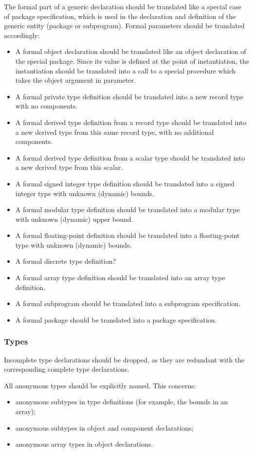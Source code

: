 \documentclass{article}
\newcounter{example}
\begin{document}
The formal part of a generic declaration should be translated like a special
case of package specification, which is used in the declaration and definition
of the generic entity (package or subprogram). Formal parameters should be
translated accordingly:
\begin{itemize}
\item A formal object declaration should be translated like an object
  declaration of the special package. Since its value is defined at the point
  of instantiation, the instantiation should be translated into a call to a
  special procedure which takes the object argument in parameter.
\item A formal private type definition should be translated into a new record
  type with no components.
\item A formal derived type definition from a record type should be translated
  into a new derived type from this same record type, with no additional
  components.
\item A formal derived type definition from a scalar type should be translated
  into a new derived type from this scalar.
\item A formal signed integer type definition should be translated into a
  signed integer type with unknown (dynamic) bounds.
\item A formal modular type definition should be translated into a modular type
  with unknown (dynamic) upper bound.
\item A formal floating-point definition should be translated into a
  floating-point type with unknown (dynamic) bounds.
\item A formal discrete type definition?
\item A formal array type definition should be translated into an array type
  definition.
\item A formal subprogram should be translated into a subprogram specification.
\item A formal package should be translated into a package specification.
\end{itemize}

\subsubsection{Types}

Incomplete type declarations should be dropped, as they are redundant with the
corresponding complete type declarations.

All anonymous types should be explicitly named. This concerns:
\begin{itemize}
\item anonymous subtypes in type definitions (for example, the bounds in an
  array);
\item anonymous subtypes in object and component declarations;
\item anonymous array types in object declarations.
\end{itemize}
\end{document}
